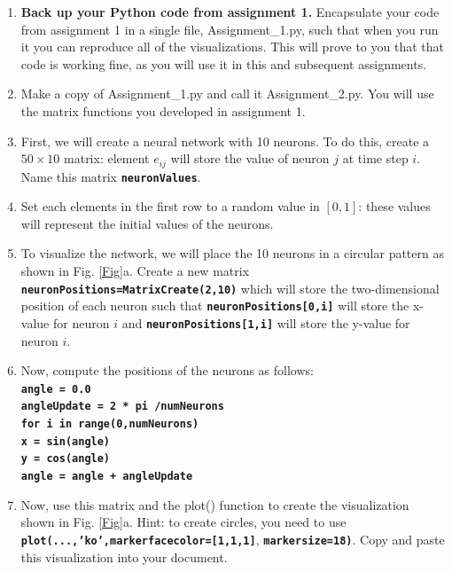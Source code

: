 \documentclass[12pt]{article}
\begin{document}
\begin{enumerate}

\item \textbf{Back up your Python code from assignment 1.} Encapsulate your code from assignment 1 in a single file, Assignment\_1.py, such that when you run it you can reproduce all of the visualizations. This will prove to you that that code is working fine, as you will use it in this and subsequent assignments.

\item Make a copy of Assignment\_1.py and call it Assignment\_2.py. You will use the matrix functions you developed in assignment 1.

\item First, we will create a neural network with 10 neurons. To do this, create a $50 \times 10$ matrix: element $e_{ij}$ will store the value of neuron $j$ at time step $i$. Name this matrix \textbf{\texttt{neuronValues}}.

\item Set each elements in the first row to a random value in $[0,1]$: these values will represent the initial values of the neurons.

\item To visualize the network, we will place the 10 neurons in a circular pattern as shown in Fig. \ref{Fig}a. Create a new matrix \textbf{\texttt{neuronPositions=MatrixCreate(2,10)}} which will store the two-dimensional position of each neuron such that \textbf{\texttt{neuronPositions[0,i]}} will store the x-value for neuron $i$ and \textbf{\texttt{neuronPositions[1,i]}} will store the y-value for neuron $i$.

\item Now, compute the positions of the neurons as follows:\\
\textbf{\texttt{angle = 0.0}}\\
\textbf{\texttt{angleUpdate = 2 * pi /numNeurons}}\\
\textbf{\texttt{for i in range(0,numNeurons)}}\\
\indent \textbf{\texttt{\hspace{1cm}x = sin(angle)}}\\
\indent \textbf{\texttt{\hspace{1cm}y = cos(angle)}}\\
\indent \textbf{\texttt{\hspace{1cm}angle = angle + angleUpdate}}\\

\item Now, use this matrix and the plot() function to create the visualization shown in Fig. \ref{Fig}a. Hint: to create circles, you need to use \textbf{\texttt{plot(...,'ko',markerfacecolor=[1,1,1]}}, \textbf{\texttt{markersize=18)}}. Copy and paste this visualization into your document.


\end{enumerate}
\end{document}
